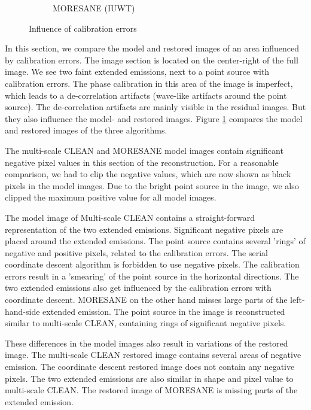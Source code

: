 \begin{figure}[!ht]
\begin{subfigure}[b]{0.82\linewidth}
		\caption{MORESANE (IUWT)}
	\end{subfigure}
	\caption{Influence of calibration errors}
	\label{results:cleancomp::calib:figure}
\end{figure}

In this section, we compare the model and restored images of an area influenced by calibration errors. The image section is located on the center-right of the full image. We see two faint extended emissions, next to a point source with calibration errors. The phase calibration in this area of the image is imperfect, which leads to a de-correlation artifacts (wave-like artifacts around the point source). The de-correlation artifacts are mainly visible in the residual images. But they also influence the model- and restored images. Figure \ref{results:cleancomp::calib:figure} compares the model and restored images of the three algorithms.

The multi-scale CLEAN and MORESANE model images contain significant negative pixel values in this section of the reconstruction. For a reasonable comparison, we had to clip the negative values, which are now shown as black pixels in the model images. Due to the bright point source in the image, we also clipped the maximum positive value for all model images.

The model image of Multi-scale CLEAN contains a straight-forward representation of the two extended emissions. Significant negative pixels are placed around the extended emissions. The point source contains several 'rings' of negative and positive pixels, related to the calibration errors. The serial coordinate descent algorithm is forbidden to use negative pixels. The calibration errors result in a 'smearing' of the point source in the horizontal directions. The two extended emissions also get influenced by the calibration errors with coordinate descent. MORESANE on the other hand misses large parts of the left-hand-side extended emission. The point source in the image is reconstructed similar to multi-scale CLEAN, containing rings of significant negative pixels.

These differences in the model images also result in variations of the restored image. The multi-scale CLEAN restored image contains several areas of negative emission. The coordinate descent restored image does not contain any negative pixels. The two extended emissions are also similar in shape and pixel value to multi-scale CLEAN. The restored image of MORESANE is missing parts of the extended emission.

